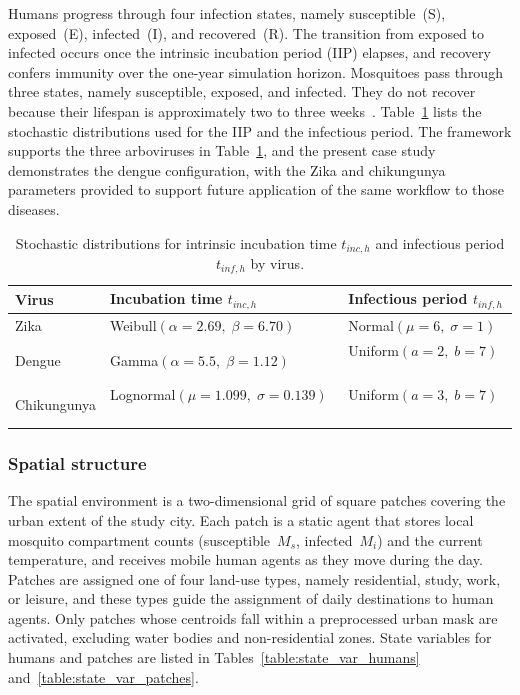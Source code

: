 \documentclass[applsci,article,accept,pdftex,moreauthors]{Definitions/mdpi}
\begin{document}
Humans progress through four infection states, namely susceptible~(S), exposed~(E), infected~(I), and recovered~(R). The transition from exposed to infected occurs once the intrinsic incubation period (IIP) elapses, and recovery confers immunity over the one-year simulation horizon. Mosquitoes pass through three states, namely susceptible, exposed, and infected. They do not recover because their lifespan is approximately two to three weeks~\cite{goindin2015parity,scheidegger2017agent}. Table~\ref{table:distributions} lists the stochastic distributions used for the IIP and the infectious period. The framework supports the three arboviruses in Table~\ref{table:distributions}, and the present case study demonstrates the dengue configuration, with the Zika and chikungunya parameters provided to support future application of the same workflow to those diseases.

\begin{table}[H]
\caption{Stochastic distributions for intrinsic incubation time $t_{inc,h}$ and infectious period $t_{inf,h}$ by virus.}
\label{table:distributions}
\begin{tabularx}{\textwidth}{>{\centering\arraybackslash}p{2.5cm}
                              >{\centering\arraybackslash}p{5.5cm}
                              >{\centering\arraybackslash}p{5cm}}
\toprule
\textbf{Virus} & \textbf{Incubation time $t_{inc,h}$} & \textbf{Infectious period $t_{inf,h}$} \\
\midrule
Zika        & Weibull$(\alpha=2.69,\;\beta=6.70)$~\cite{Krow-Lucal2017}         & Normal$(\mu=6,\;\sigma=1)$~\cite{PMID:29617955} \\
Dengue      & Gamma$(\alpha=5.5,\;\beta=1.12)$~\cite{Chan2012}                  & Uniform$(a=2,\;b=7)$~\cite{Chan2012} \\
Chikungunya & Lognormal$(\mu=1.099,\;\sigma=0.139)$~\cite{Leung2020,manore2015eqs} & Uniform$(a=3,\;b=7)$~\cite{manore2015eqs} \\
\bottomrule
\end{tabularx}
\end{table}

\subsubsection{Spatial structure}
\label{sec:spatial}

The spatial environment is a two-dimensional grid of square patches covering the urban extent of the study city. Each patch is a static agent that stores local mosquito compartment counts (susceptible~$M_s$, infected~$M_i$) and the current temperature, and receives mobile human agents as they move during the day. Patches are assigned one of four land-use types, namely residential, study, work, or leisure, and these types guide the assignment of daily destinations to human agents. Only patches whose centroids fall within a preprocessed urban mask are activated, excluding water bodies and non-residential zones. State variables for humans and patches are listed in Tables~\ref{table:state_var_humans} and~\ref{table:state_var_patches}.
\end{document}
